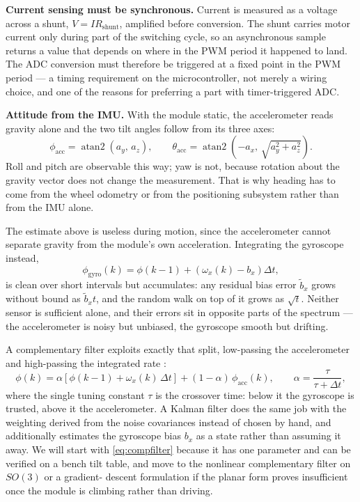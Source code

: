 \documentclass[11pt,a4paper]{article}
\begin{document}
{\noindent\textbf{Current sensing must be synchronous.} Current is measured as a
voltage across a shunt, $V = IR_{\text{shunt}}$, amplified before conversion.
The shunt carries motor current only during part of the switching cycle, so an
asynchronous sample returns a value that depends on where in the PWM period it
happened to land. The ADC conversion must therefore be triggered at a fixed
point in the PWM period --- a timing requirement on the microcontroller, not
merely a wiring choice, and one of the reasons for preferring a part with
timer-triggered ADC.

\noindent\textbf{Attitude from the IMU.} With the module static, the
accelerometer reads gravity alone and the two tilt angles follow from its three
axes:
\begin{equation}
  \phi_{\text{acc}} = \operatorname{atan2}\!\left(a_y,\, a_z\right),
  \qquad
  \theta_{\text{acc}} = \operatorname{atan2}\!\left(-a_x,\, \sqrt{a_y^2 + a_z^2}\right).
\end{equation}
Roll and pitch are observable this way; yaw is not, because rotation about the
gravity vector does not change the measurement. That is why heading has to come
from the wheel odometry or from the positioning subsystem rather than from the
IMU alone.

The estimate above is useless during motion, since the accelerometer cannot
separate gravity from the module's own acceleration. Integrating the gyroscope
instead,
\begin{equation}
  \phi_{\text{gyro}}(k) = \phi(k-1) + \left(\omega_x(k) - b_x\right)\Delta t ,
\end{equation}
is clean over short intervals but accumulates: any residual bias error
$\tilde{b}_x$ grows without bound as $\tilde{b}_x t$, and the random walk on
top of it grows as $\sqrt{t}$. Neither sensor is sufficient alone, and their
errors sit in opposite parts of the spectrum --- the accelerometer is noisy but
unbiased, the gyroscope smooth but drifting.

A complementary filter exploits exactly that split, low-passing the
accelerometer and high-passing the integrated rate \cite{higgins1975}:
\begin{equation}
  \phi(k) = \alpha\left[\phi(k-1) + \omega_x(k)\,\Delta t\right]
          + (1-\alpha)\,\phi_{\text{acc}}(k),
  \qquad
  \alpha = \frac{\tau}{\tau + \Delta t},
  \label{eq:compfilter}
\end{equation}
where the single tuning constant $\tau$ is the crossover time: below it the
gyroscope is trusted, above it the accelerometer. A Kalman filter does the same
job with the weighting derived from the noise covariances instead of chosen by
hand, and additionally estimates the gyroscope bias $b_x$ as a state rather
than assuming it away. We will start with \eqref{eq:compfilter} because it has
one parameter and can be verified on a bench tilt table, and move to the
nonlinear complementary filter on $SO(3)$ \cite{mahony2008} or a gradient-
descent formulation \cite{madgwick2011} if the planar form proves insufficient
once the module is climbing rather than driving.
}
\end{document}

